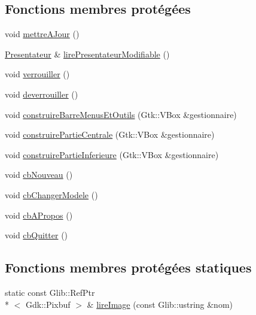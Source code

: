 \subsection*{Fonctions membres protégées}
\begin{DoxyCompactItemize}
\item 
void \hyperlink{classgrenouilloland_1_1Vue_a05dde5184e07bb61266e311b5fca58e6}{mettre\-A\-Jour} ()
\item 
\hyperlink{classgrenouilloland_1_1Presentateur}{Presentateur} \& \hyperlink{classgrenouilloland_1_1Vue_a69daf9edcf49ae15bb1d593f642bde07}{lire\-Presentateur\-Modifiable} ()
\item 
void \hyperlink{classgrenouilloland_1_1Vue_a8d220428da4420cdb0bf039c915412ac}{verrouiller} ()
\item 
void \hyperlink{classgrenouilloland_1_1Vue_a6fa4cd2dc80413b819679fdd24ba7e2e}{deverrouiller} ()
\item 
void \hyperlink{classgrenouilloland_1_1Vue_a6f7d83c684de2e51c2536d74614c6a21}{construire\-Barre\-Menus\-Et\-Outils} (Gtk\-::\-V\-Box \&gestionnaire)
\item 
void \hyperlink{classgrenouilloland_1_1Vue_a5020ff24aa99091a71f8b812be8578dc}{construire\-Partie\-Centrale} (Gtk\-::\-V\-Box \&gestionnaire)
\item 
void \hyperlink{classgrenouilloland_1_1Vue_ac2f033ddbd1508798f748e8fb816eb34}{construire\-Partie\-Inferieure} (Gtk\-::\-V\-Box \&gestionnaire)
\item 
void \hyperlink{classgrenouilloland_1_1Vue_a094c688903d968d9366460a5431a0130}{cb\-Nouveau} ()
\item 
void \hyperlink{classgrenouilloland_1_1Vue_a253d6db7fc7664d060025cd03d9566d4}{cb\-Changer\-Modele} ()
\item 
void \hyperlink{classgrenouilloland_1_1Vue_a3b30a58e0986b5ad9368a85995a39293}{cb\-A\-Propos} ()
\item 
void \hyperlink{classgrenouilloland_1_1Vue_a136783ac8ab9e7085630e9db4924a189}{cb\-Quitter} ()
\end{DoxyCompactItemize}
\subsection*{Fonctions membres protégées statiques}
\begin{DoxyCompactItemize}
\item 
static const Glib\-::\-Ref\-Ptr\\*
$<$ Gdk\-::\-Pixbuf $>$ \& \hyperlink{classgrenouilloland_1_1Vue_a13bd0ca693c418c7b5ee30ac7be56448}{lire\-Image} (const Glib\-::ustring \&nom)
\end{DoxyCompactItemize}
